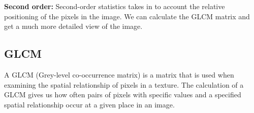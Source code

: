      \vspace{10px}
      
      \textbf{Second order:} Second-order statistics takes in to account the relative positioning of the pixels in the image. We can calculate the GLCM matrix and get a much more detailed view of the image. \\
      
      
      
      \subsection{GLCM}
        A GLCM (Grey-level co-occurrence matrix) is a matrix that is used when examining the spatial relationship of pixels in a texture. 
        The calculation of a GLCM gives us how often pairs of pixels with specific values and a specified spatial relationship occur at a given place in an image. %
      

